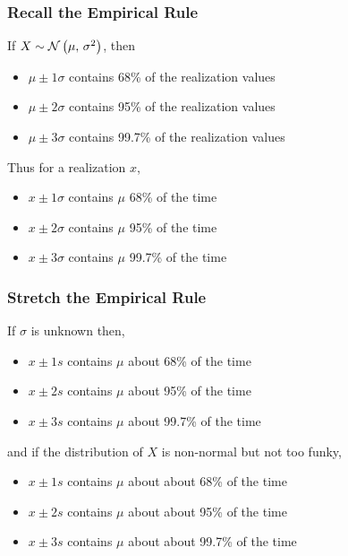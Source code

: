 \documentclass[handout]{beamer}
\begin{document}
\begin{frame}\frametitle{Recall the Empirical Rule}

If $X \sim \mathcal{N}\left(\mu,\,\sigma^2\right)$, then 

\begin{itemize}
\item $\mu \pm 1 \sigma$ contains 68\% of the realization values
\item $\mu \pm 2 \sigma$ contains 95\% of the realization values
\item $\mu \pm 3 \sigma$ contains 99.7\% of the realization values
\end{itemize} \pause 

Thus for a realization $x$,

\begin{itemize}
\item $x \pm 1 \sigma$ contains $\mu$ 68\% of the time
\item $x \pm 2 \sigma$ contains $\mu$ 95\% of the time
\item $x \pm 3 \sigma$ contains $\mu$ 99.7\% of the time
\end{itemize}

\end{frame}

\begin{frame}\frametitle{Stretch the Empirical Rule}

If $\sigma$ is unknown then,

\begin{itemize}
\item $x \pm 1 s$ contains $\mu$ about 68\% of the time
\item $x \pm 2 s$ contains $\mu$ about 95\% of the time
\item $x \pm 3 s$ contains $\mu$ about 99.7\% of the time
\end{itemize} \pause 

and if the distribution of $X$ is non-normal but not too funky,

\begin{itemize}
\item $x \pm 1 s$ contains $\mu$ about about 68\% of the time
\item $x \pm 2 s$ contains $\mu$ about about 95\% of the time
\item $x \pm 3 s$ contains $\mu$ about about 99.7\% of the time
\end{itemize}

\end{frame}
\end{document}

